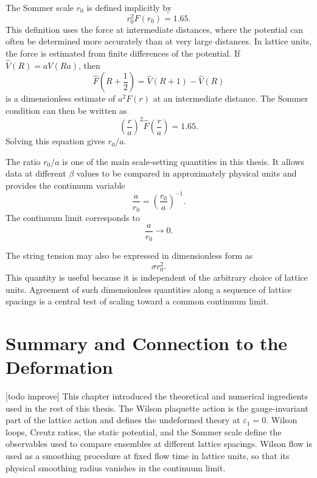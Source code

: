 \documentclass[12pt,a4paper,oneside,numbers=noenddot]{scrreprt}
\newcommand{\eps}{\varepsilon}
\newcommand{\latspacing}{a}
\newcommand{\rzero}{r_0}
\newcommand{\stringtension}{\sigma}
\begin{document}
The Sommer scale $\rzero$ is defined implicitly by
\begin{equation}
  \rzero^2 F(\rzero) = 1.65 .
  \label{eq:sommer-scale-definition}
\end{equation}
This definition uses the force at intermediate distances, where the potential
can often be determined more accurately than at very large distances. In lattice
units, the force is estimated from finite differences of the potential. If
$\hat V(R)=\latspacing V(R\latspacing)$, then
\begin{equation}
  \hat F\left(R+\frac{1}{2}\right)
  =
  \hat V(R+1) - \hat V(R)
\end{equation}
is a dimensionless estimate of $\latspacing^2 F(r)$ at an intermediate distance.
The Sommer condition can then be written as
\begin{equation}
  \left(\frac{r}{\latspacing}\right)^2
  \hat F\left(\frac{r}{\latspacing}\right)
  =
  1.65 .
  \label{eq:sommer-scale-lattice-units}
\end{equation}
Solving this equation gives $\rzero/\latspacing$.

The ratio $\rzero/\latspacing$ is one of the main scale-setting quantities in
this thesis. It allows data at different $\beta$ values to be compared in
approximately physical units and provides the continuum variable
\begin{equation}
  \frac{\latspacing}{\rzero}
  =
  \left(\frac{\rzero}{\latspacing}\right)^{-1}.
\end{equation}
The continuum limit corresponds to
\begin{equation}
  \frac{\latspacing}{\rzero}
  \to 0.
\end{equation}

The string tension may also be expressed in dimensionless form as
\begin{equation}
  \stringtension \rzero^2 .
\end{equation}
This quantity is useful because it is independent of the arbitrary choice of
lattice units. Agreement of such dimensionless quantities along a sequence of
lattice spacings is a central test of scaling toward a common continuum limit.

\section*{Summary and Connection to the Deformation}

[todo improve] This chapter introduced the theoretical and numerical ingredients used in the
rest of this thesis. The Wilson plaquette action is the gauge-invariant part of
the lattice action and defines the undeformed theory at \(\eps_1=0\). Wilson
loops, Creutz ratios, the static potential, and the Sommer scale define the
observables used to compare ensembles at different lattice spacings. Wilson flow
is used as a smoothing procedure at fixed flow time in lattice units, so that
its physical smoothing radius vanishes in the continuum limit.
\end{document}
